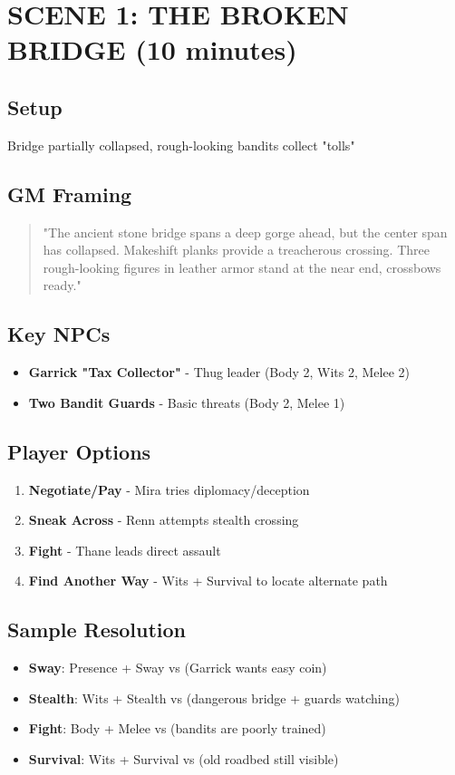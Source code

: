 \documentclass[11pt]{article}
\begin{document}
\section{SCENE 1: THE BROKEN BRIDGE (10 minutes)}

\subsection*{Setup}
Bridge partially collapsed, rough-looking bandits collect "tolls"

\subsection*{GM Framing}
\begin{quote}
"The ancient stone bridge spans a deep gorge ahead, but the center span has collapsed. Makeshift planks provide a treacherous crossing. Three rough-looking figures in leather armor stand at the near end, crossbows ready."
\end{quote}

\subsection*{Key NPCs}
\begin{itemize}
\item \textbf{Garrick "Tax Collector"} - Thug leader (Body 2, Wits 2, Melee 2)
\item \textbf{Two Bandit Guards} - Basic threats (Body 2, Melee 1)
\end{itemize}

\subsection*{Player Options}
\begin{enumerate}
\item \textbf{Negotiate/Pay} - Mira tries diplomacy/deception
\item \textbf{Sneak Across} - Renn attempts stealth crossing
\item \textbf{Fight} - Thane leads direct assault
\item \textbf{Find Another Way} - Wits + Survival to locate alternate path
\end{enumerate}

\subsection*{Sample Resolution}
\begin{itemize}
\item \textbf{Sway}: Presence + Sway vs  (Garrick wants easy coin)
\item \textbf{Stealth}: Wits + Stealth vs  (dangerous bridge + guards watching)
\item \textbf{Fight}: Body + Melee vs  (bandits are poorly trained)
\item \textbf{Survival}: Wits + Survival vs  (old roadbed still visible)
\end{itemize}
\end{document}
